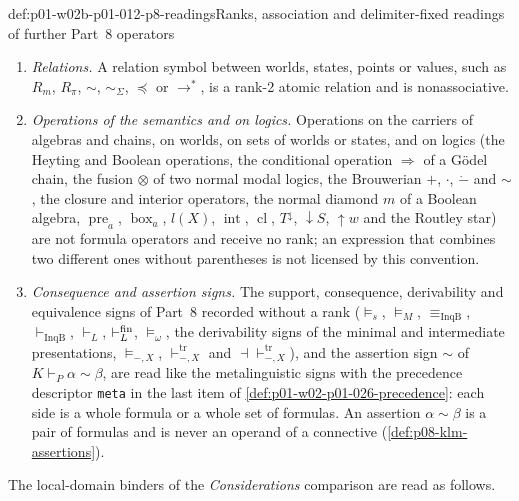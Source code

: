 \begin{hbconvention}{def:p01-w02b-p01-012-p8-readings}{Ranks, association and delimiter-fixed readings of further Part~8 operators}
\begin{enumerate}
  \(V[p\leftarrow U]\) and \(g[x\mapsto d]\), delimit their argument
  completely.  An accent or a superscript that denotes a map on formulas
  or sets, such as \(\widehat\alpha\), \(\overline\alpha\),
  \(\widetilde K\), \(K^p\) or \(\varphi^{\mathrm{cl}}\), applies to the
  single letter or the bracketed expression that carries it.  In each case
  the whole form is one operand.
\item \emph{Relations.}  A relation symbol between worlds, states, points
  or values, such as \(R_m\), \(R_\pi\), \(\sim\), \(\sim_\Sigma\),
  \(\preceq\) or \(\to^*\), is a rank-2 atomic relation and is
  nonassociative.
\item \emph{Operations of the semantics and on logics.}  Operations on the
  carriers of algebras and chains, on worlds, on sets of worlds or states,
  and on logics (the Heyting and Boolean operations, the conditional
  operation \(\Rightarrow\) of a G\"odel chain, the fusion \(\otimes\) of two normal
  modal logics, the Brouwerian \(+\), \(\cdot\), \(\mathbin{\dot-}\)
  and \(\mathord\sim\), the closure and interior operators, the normal
  diamond \(m\) of a Boolean algebra, \(\operatorname{pre}_a\),
  \(\operatorname{box}_a\), \(l(X)\), \(\operatorname{int}\),
  \(\operatorname{cl}\), \(T^\downarrow\), \({\downarrow}S\), \({\uparrow}w\)
  and the Routley star) are not formula operators and receive no rank; an
  expression that combines two different ones without parentheses is not
  licensed by this convention.
\item \emph{Consequence and assertion signs.}  The support, consequence,
  derivability and equivalence signs of Part~8 recorded without a rank
  (\(\models_s\), \(\models_M\), \(\equiv_{\mathrm{InqB}}\),
  \(\vdash_{\mathrm{InqB}}\), \(\vdash_L\), \(\vdash_L^{\rm fin}\),
  \(\models_\omega\), the derivability signs of the minimal and
  intermediate presentations, \(\models_{-,X}\),
  \(\vdash^{\mathrm{tr}}_{-,X}\) and \(\dashv\vdash^{\mathrm{tr}}_{-,X}\)),
  and the assertion sign \(\sim\) of \(K\vdash_P\alpha\sim\beta\), are
  read like the metalinguistic signs with the precedence descriptor
  \texttt{meta} in the last item of \cref{def:p01-w02-p01-026-precedence}:
  each side is a whole formula or a whole set of formulas.  An assertion
  \(\alpha\sim\beta\) is a pair of formulas and is never an operand of a
  connective (\cref{def:p08-klm-assertions}).
\end{enumerate}
The local-domain binders of the \emph{Considerations} comparison are read
as follows.
\begin{enumerate}\setcounter{enumi}{27}

\end{enumerate}
\end{hbconvention}
